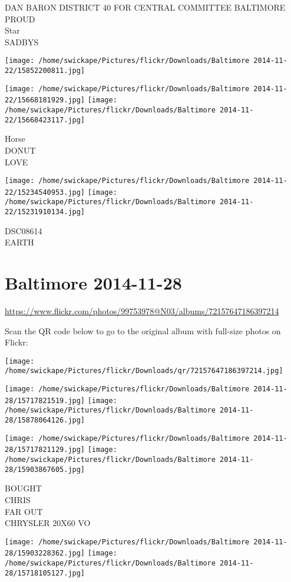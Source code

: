 \documentclass[10pt,letterpaper]{article}
\begin{document}
DAN BARON DISTRICT 40 FOR CENTRAL COMMITTEE BALTIMORE PROUD\\
Star\\
SADBYS
\pagebreak

\texttt{[image: /home/swickape/Pictures/flickr/Downloads/Baltimore 2014-11-22/15852200811.jpg]}

\vspace{0.25in}
\texttt{[image: /home/swickape/Pictures/flickr/Downloads/Baltimore 2014-11-22/15668181929.jpg]}
\texttt{[image: /home/swickape/Pictures/flickr/Downloads/Baltimore 2014-11-22/15668423117.jpg]}

Horse\\
DONUT\\
LOVE
\pagebreak

\texttt{[image: /home/swickape/Pictures/flickr/Downloads/Baltimore 2014-11-22/15234540953.jpg]}
\texttt{[image: /home/swickape/Pictures/flickr/Downloads/Baltimore 2014-11-22/15231910134.jpg]}

DSC08614\\
EARTH
\pagebreak

\section*{Baltimore 2014-11-28}

\url{https://www.flickr.com/photos/99753978@N03/albums/72157647186397214}

Scan the QR code below to go to the original album with full-size photos on Flickr:

\texttt{[image: /home/swickape/Pictures/flickr/Downloads/qr/72157647186397214.jpg]}
\pagebreak

\texttt{[image: /home/swickape/Pictures/flickr/Downloads/Baltimore 2014-11-28/15717821519.jpg]}
\texttt{[image: /home/swickape/Pictures/flickr/Downloads/Baltimore 2014-11-28/15878064126.jpg]}

\texttt{[image: /home/swickape/Pictures/flickr/Downloads/Baltimore 2014-11-28/15717821129.jpg]}
\texttt{[image: /home/swickape/Pictures/flickr/Downloads/Baltimore 2014-11-28/15903867605.jpg]}

BOUGHT\\
CHRIS\\
FAR OUT\\
CHRYSLER 20X60 VO
\pagebreak

\texttt{[image: /home/swickape/Pictures/flickr/Downloads/Baltimore 2014-11-28/15903228362.jpg]}
\texttt{[image: /home/swickape/Pictures/flickr/Downloads/Baltimore 2014-11-28/15718105127.jpg]}
\end{document}
